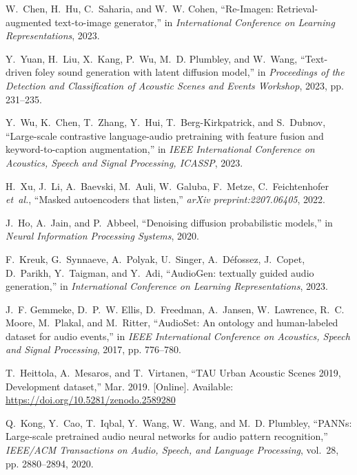 \documentclass{article}
\begin{document}
\begin{thebibliography}{10}
W.~Chen, H.~Hu, C.~Saharia, and W.~W. Cohen, ``{Re-Imagen}: Retrieval-augmented text-to-image generator,'' in \emph{International Conference on Learning Representations}, 2023.

Y.~Yuan, H.~Liu, X.~Kang, P.~Wu, M.~D. Plumbley, and W.~Wang, ``Text-driven foley sound generation with latent diffusion model,'' in \emph{Proceedings of the Detection and Classification of Acoustic Scenes and Events Workshop}, 2023, pp. 231--235.

Y.~Wu, K.~Chen, T.~Zhang, Y.~Hui, T.~Berg-Kirkpatrick, and S.~Dubnov, ``Large-scale contrastive language-audio pretraining with feature fusion and keyword-to-caption augmentation,'' in \emph{IEEE International Conference on Acoustics, Speech and Signal Processing, ICASSP}, 2023.

H.~Xu, J.~Li, A.~Baevski, M.~Auli, W.~Galuba, F.~Metze, C.~Feichtenhofer \emph{et~al.}, ``Masked autoencoders that listen,'' \emph{arXiv preprint:2207.06405}, 2022.

J.~Ho, A.~Jain, and P.~Abbeel, ``Denoising diffusion probabilistic models,'' in \emph{{Neural Information Processing Systems}}, 2020.

F.~{Kreuk}, G.~{Synnaeve}, A.~{Polyak}, U.~{Singer}, A.~{D{\'e}fossez}, J.~{Copet}, D.~{Parikh}, Y.~{Taigman}, and Y.~{Adi}, ``{AudioGen: textually guided audio generation},'' in \emph{International Conference on Learning Representations}, 2023.

J.~F. Gemmeke, D.~P.~W. Ellis, D.~Freedman, A.~Jansen, W.~Lawrence, R.~C. Moore, M.~Plakal, and M.~Ritter, ``{AudioSet}: An ontology and human-labeled dataset for audio events,'' in \emph{IEEE International Conference on Acoustics, Speech and Signal Processing}, 2017, pp. 776--780.

\BIBentryALTinterwordspacing
T.~Heittola, A.~Mesaros, and T.~Virtanen, ``{TAU Urban Acoustic Scenes 2019, Development dataset},'' Mar. 2019. [Online]. Available: \url{https://doi.org/10.5281/zenodo.2589280}
\BIBentrySTDinterwordspacing

Q.~Kong, Y.~Cao, T.~Iqbal, Y.~Wang, W.~Wang, and M.~D. Plumbley, ``{PANNs}: Large-scale pretrained audio neural networks for audio pattern recognition,'' \emph{IEEE/ACM Transactions on Audio, Speech, and Language Processing}, vol.~28, pp. 2880--2894, 2020.

\end{thebibliography}
\end{document}
